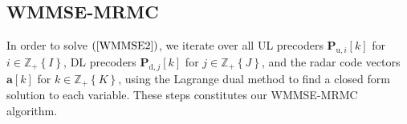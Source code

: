 \documentclass[10pt,journal]{IEEEtran}
\newcommand{\paren}[1]{\left({#1}\right)}
\newcommand{\bracket}[1]{{\left [{#1}\right ]}}
\newcommand{\braces}[1]{{\left\{ {#1}\right\}}}
\newcommand{\PiB}{\mathbf{P}_{\textrm{u},i}\bracket{k}}
\newcommand{\PBj}{\mathbf{P}_{\textrm{d},j}\bracket{k}}
\theoremstyle{definition}
\begin{document}
\subsection{WMMSE-MRMC} \label{subsec:seq}
 In order to solve $\paren{\ref{WMMSE2}}$, we iterate over all UL precoders $\PiB$ for $i\in\mathbb{Z}_+\braces{I}$, DL precoders $\PBj$ for $j\in\mathbb{Z}_+\braces{J}$, and the radar code vectors $\mathbf{a}\bracket{k}$ for $k\in\mathbb{Z}_+\braces{K}$, %
 using the Lagrange dual method to find a closed form solution to each variable. These steps constitutes our WMMSE-MRMC algorithm. 
 
\end{document}
